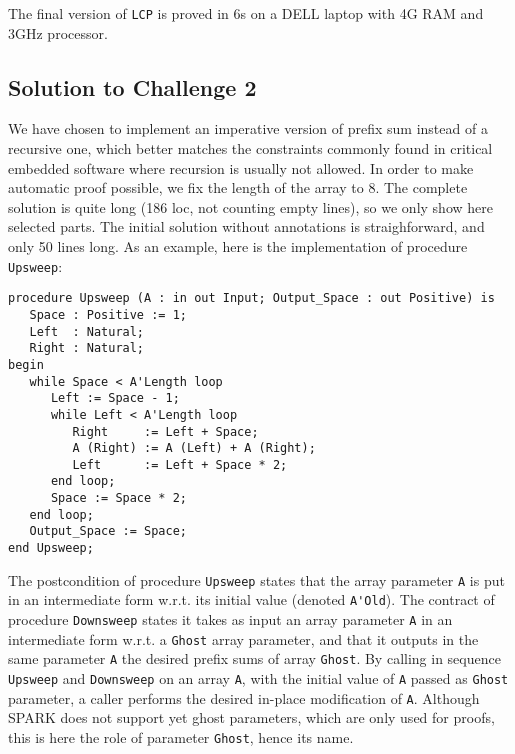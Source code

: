 \documentclass[sttt,draft]{svjour}
\newcommand{\wrt}{w.r.t.\xspace}
\begin{document}
The final version of \verb|LCP| is proved in 6s on a DELL laptop with 4G RAM
and 3GHz processor.

\subsection{Solution to Challenge 2}

We have chosen to implement an imperative version of prefix sum instead of a
recursive one, which better matches the constraints commonly found in critical
embedded software where recursion is usually not allowed. In order to make
automatic proof possible, we fix the length of the array to 8. The complete
solution is quite long (186 loc, not counting empty lines), so we only show
here selected parts. The initial solution without annotations is
straighforward, and only 50 lines long. As an example, here is the
implementation of procedure \verb|Upsweep|:

\begin{footnotesize}
\begin{verbatim}
procedure Upsweep (A : in out Input; Output_Space : out Positive) is
   Space : Positive := 1;
   Left  : Natural;
   Right : Natural;
begin
   while Space < A'Length loop
      Left := Space - 1;
      while Left < A'Length loop
         Right     := Left + Space;
         A (Right) := A (Left) + A (Right);
         Left      := Left + Space * 2;
      end loop;
      Space := Space * 2;
   end loop;
   Output_Space := Space;
end Upsweep;
\end{verbatim}
\end{footnotesize}

The postcondition of procedure \verb|Upsweep| states that
the array parameter \verb|A| is put in an intermediate form \wrt its initial
value (denoted \verb|A'Old|). The contract of procedure \verb|Downsweep| states
it takes as input an array parameter \verb|A| in an intermediate form \wrt a
\verb|Ghost| array parameter, and that it outputs in the same parameter
\verb|A| the desired prefix sums of array \verb|Ghost|. By calling in sequence
\verb|Upsweep| and \verb|Downsweep| on an array \verb|A|, with the initial
value of \verb|A| passed as \verb|Ghost| parameter, a caller performs the
desired in-place modification of \verb|A|. Although SPARK does not support yet
ghost parameters, which are only used for proofs, this is here the role of
parameter \verb|Ghost|, hence its name.
\end{document}
